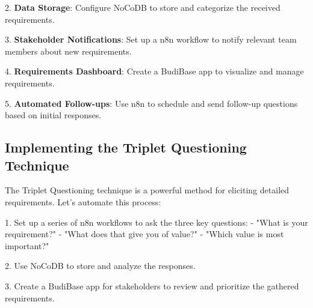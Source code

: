 
2. \textbf{Data Storage}: Configure NoCoDB to store and categorize the received requirements.


3. \textbf{Stakeholder Notifications}: Set up a n8n workflow to notify relevant team members about new requirements.


4. \textbf{Requirements Dashboard}: Create a BudiBase app to visualize and manage requirements.


5. \textbf{Automated Follow-ups}: Use n8n to schedule and send follow-up questions based on initial responses.


\subsection{Implementing the Triplet Questioning Technique}

The Triplet Questioning technique is a powerful method for eliciting detailed requirements. Let's automate this process:

1. Set up a series of n8n workflows to ask the three key questions:
- "What is your requirement?"
- "What does that give you of value?"
- "Which value is most important?"

2. Use NoCoDB to store and analyze the responses.

3. Create a BudiBase app for stakeholders to review and prioritize the gathered requirements.

